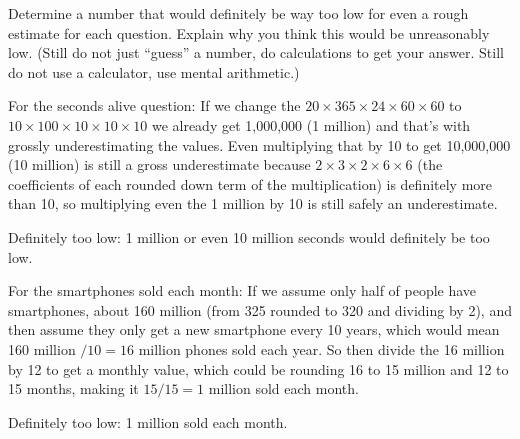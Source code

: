 \documentclass[12pt]{ximera}
\begin{document}
\begin{problem}
Determine a number that would definitely be way too low for even a rough estimate for
each question. Explain why you think this would be unreasonably low. (Still do not just
``guess'' a number, do calculations to get your answer. Still do not use a calculator,
use mental arithmetic.)

\begin{freeResponse}
\end{freeResponse}

\begin{solution}
For the seconds alive question: If we change the $20 \times 365 \times 24 \times 60
\times 60$ to $10 \times 100 \times 10 \times 10 \times 10$ we already get 1,000,000 (1
million) and that's with grossly underestimating the values. Even multiplying that by 10
to get 10,000,000 (10 million) is still a gross underestimate because $2 \times 3 \times
2 \times 6 \times 6$ (the coefficients of each rounded down term of the multiplication)
is definitely more than 10, so multiplying even the 1 million by 10 is still safely an
underestimate.

Definitely too low: 1 million or even 10 million seconds would definitely be too low.

For the smartphones sold each month: If we assume only half of people have smartphones,
about 160 million (from 325 rounded to 320 and dividing by 2), and then assume they only
get a new smartphone every 10 years, which would mean 160 million $/ 10 = 16$ million
phones sold each year. So then divide the 16 million by 12 to get a monthly value, which
could be rounding 16 to 15 million and 12 to 15 months, making it $15/15 = 1$ million
sold each month.

Definitely too low: 1 million sold each month.
\end{solution}
\end{problem}
\end{document}
